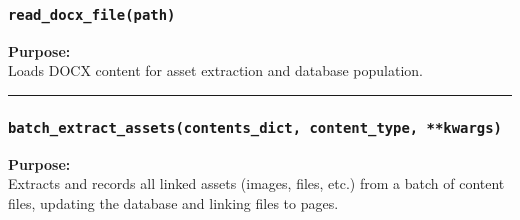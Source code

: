 \subsubsection{\texorpdfstring{\texttt{read\_docx\_file(path)}}{read\_docx\_file(path)}}\label{read_docx_filepath}

\begin{Shaded}
\begin{Highlighting}[]
\end{Highlighting}
\end{Shaded}

\textbf{Purpose:}\\
Loads DOCX content for asset extraction and database population.

\begin{center}\rule{0.5\linewidth}{0.5pt}\end{center}

\subsubsection{\texorpdfstring{\texttt{batch\_extract\_assets(contents\_dict,\ content\_type,\ **kwargs)}}{batch\_extract\_assets(contents\_dict, content\_type, **kwargs)}}\label{batch_extract_assetscontents_dict-content_type-kwargs}

\begin{Shaded}
\begin{Highlighting}[]
\OperatorTok{**}
\end{Highlighting}
\end{Shaded}

\textbf{Purpose:}\\
Extracts and records all linked assets (images, files, etc.) from a
batch of content files, updating the database and linking files to
pages.

